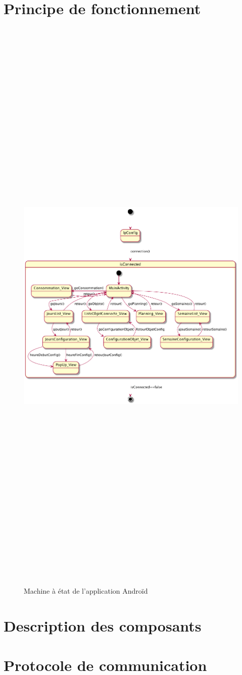 \documentclass[11pt,a4paper]{report} %
\begin{document}
		
		\section{Principe de fonctionnement}
		\begin{figure}[H]
			\centering
			\includegraphics[width = 18cm ,height = 30cm,keepaspectratio]{./Picture/machine a etat java.png}
			\caption{Machine à état de l'application Androïd} 
			\label{diagClass}
		\end{figure}
		\newpage
		
		\section{Description des composants}
		
		
		
		\section{Protocole de communication}
		
		
		
\end{document}
